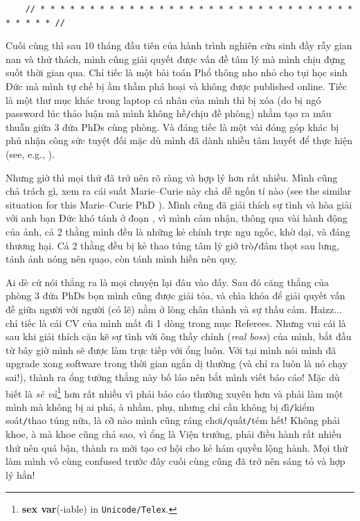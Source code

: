 \documentclass[12pt]{article}
\begin{document}
\begin{verbatim}
	// * * * * * * * * * * * * * * * * * * * * * * * * * * * * * * * * * * * * * //
\end{verbatim}

\noindent
{} Cuối cùng thì sau 10 tháng đầu tiên của hành trình nghiên cứu sinh đầy rẫy gian nan và thử thách, mình cũng giải quyết được vấn đề tâm lý mà mình chịu đựng suốt thời gian qua. Chỉ tiếc là một bài toán Phổ thông nho nhỏ cho tụi học sinh Đức mà mình tự chế bị ầm thầm phá hoại và không được published online. Tiếc là một thư mục khác trong laptop cá nhân của mình thì bị xóa (do bị ngó password lúc thảo luận mà mình không hề{\tt/}chịu đề phòng) nhằm tạo ra mâu thuẫn giữa 3 đứa PhDs cùng phòng. Và đáng tiếc là một vài đóng góp khác bị phủ nhận công sức tuyệt đối mặc dù mình đã dành nhiều tâm huyết để thực hiện (see, e.g., \cite{phill2018,Young-Powell2018}).

Nhưng giờ thì mọi thứ đã trở nên rõ ràng và hợp lý hơn rất nhiều. Mình cũng chả trách gì, xem ra cái suất Marie--Curie này chả dễ ngốn tí nào (see the similar situation for this Marie--Curie PhD \cite{FundamentalPessimist2020}). Mình cũng đã giải thích sự tình và hòa giải với anh bạn Đức khó tánh ở đoạn , vì mình cảm nhận, thông qua vài hành động của ảnh, cả 2 thằng mình đều là những kẻ chính trực ngu ngốc, khờ dại, và đáng thương hại. Cả 2 thằng đều bị kẻ thao túng tâm lý giở trò{\tt/}đâm thọt sau lưng, tánh ảnh nóng nên quạo, còn tánh mình hiền nên quỵ.

Ai dè cứ nói thẳng ra là mọi chuyện lại đâu vào đấy. Sau đó căng thẳng của phòng 3 đứa PhDs bọn mình cũng được giải tỏa, và chìa khóa để giải quyết vấn đề giữa người với người (có lẽ) nằm ở lòng chân thành và sự thấu cảm. Haizz$\ldots$ chỉ tiếc là cái CV của mình mất đi 1 dòng trong mục Referees. Nhưng vui cái là sau khi giải thích cặn kẽ sự tình với ông thầy chính ({\it real boss}) của mình, bắt đầu từ bây giờ mình sẽ được làm trực tiếp với ổng luôn. Với tại mình nói mình đã upgrade xong software trong thời gian ngắn dị thường (và chỉ ra luôn là nó chạy sai!), thành ra ổng tưởng thằng này bố láo nên bắt mình viết báo cáo! Mặc dù biết là {\it sẽ vả}\footnote{\textbf{sex var}(-iable) in \texttt{Unicode/Telex}.} hơn rất nhiều vì phải báo cáo thường xuyên hơn và phải làm một mình mà không bị ai phá, à nhầm, phụ, nhưng chỉ cần không bị đì{\tt/}kiểm soát{\tt/}thao túng nữa, là cỡ nào mình cũng ráng chơi{\tt/}quất{\tt/}tém hết! Không phải khoe, à mà khoe cũng chả sao, vì ổng là Viện trưởng, phải điều hành rất nhiều thứ nên quá bận, thành ra mới tạo cơ hội cho kẻ hám quyền lộng hành. Mọi thứ làm mình vô cùng confused trước đây cuối cùng cũng đã trở nên sáng tỏ và hợp lý hẳn!
\end{document}
